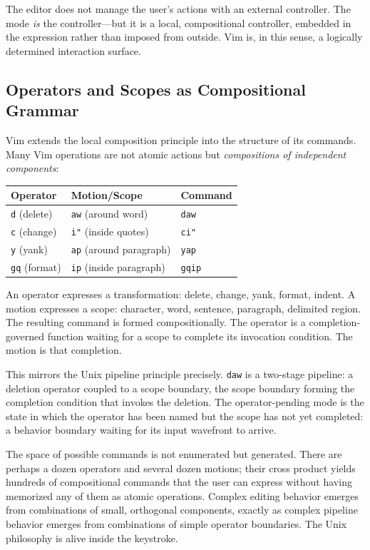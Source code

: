\documentclass[12pt, a4paper]{article}
\begin{document}
The editor does not manage the user's actions with an external
controller. The mode \emph{is} the controller---but it is a
local, compositional controller, embedded in the expression
rather than imposed from outside. Vim is, in this sense, a
logically determined interaction surface.

\subsection{Operators and Scopes as Compositional Grammar}

Vim extends the local composition principle into the structure
of its commands. Many Vim operations are not atomic actions
but \emph{compositions of independent components}:

\begin{center}
\begin{tabular}{lll}
\textbf{Operator} & \textbf{Motion/Scope} & \textbf{Command} \\
\hline
\texttt{d} (delete) & \texttt{aw} (around word) & \texttt{daw} \\
\texttt{c} (change) & \texttt{i"} (inside quotes) & \texttt{ci"} \\
\texttt{y} (yank)   & \texttt{ap} (around paragraph) & \texttt{yap} \\
\texttt{gq} (format) & \texttt{ip} (inside paragraph) & \texttt{gqip} \\
\end{tabular}
\end{center}

An operator expresses a transformation: delete, change, yank,
format, indent. A motion expresses a scope: character, word,
sentence, paragraph, delimited region. The resulting command is
formed compositionally. The operator is a completion-governed
function waiting for a scope to complete its invocation condition.
The motion is that completion.

This mirrors the Unix pipeline principle precisely. \texttt{daw}
is a two-stage pipeline: a deletion operator coupled to a scope
boundary, the scope boundary forming the completion condition
that invokes the deletion. The operator-pending mode is the
state in which the operator has been named but the scope has
not yet completed: a behavior boundary waiting for its input
wavefront to arrive.

The space of possible commands is not enumerated but generated.
There are perhaps a dozen operators and several dozen motions;
their cross product yields hundreds of compositional commands
that the user can express without having memorized any of them
as atomic operations. Complex editing behavior emerges from
combinations of small, orthogonal components, exactly as complex
pipeline behavior emerges from combinations of simple operator
boundaries. The Unix philosophy is alive inside the keystroke.
\end{document}
